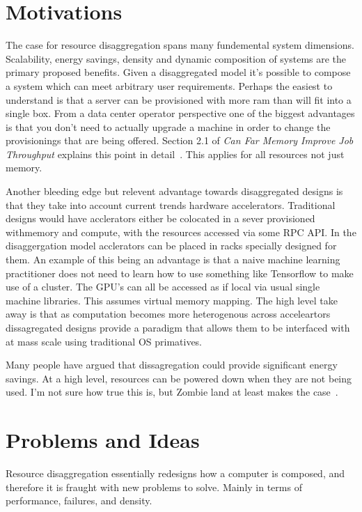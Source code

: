 \section{Motivations}


The case for resource disaggregation spans many fundemental system dimensions.
Scalability, energy savings, density and dynamic composition of systems are the
primary proposed benefits. Given a disaggregated model it’s possible to compose
a system which can meet arbitrary user requirements. Perhaps the easiest to
understand is that a server can be provisioned with more ram than will fit into
a single box.  From a data center operator perspective one of the biggest
advantages is that you don't need to actually upgrade a machine in order to
change the provisionings that are being offered. Section 2.1 of \textit{Can Far
Memory Improve Job Throughput} explains this point in
detail~\cite{jobthroughput}. This applies for all resources not just memory.

Another bleeding edge but relevent advantage towards disaggregated designs is
that they take into account current trends hardware accelerators. Traditional
designs would have acclerators either be colocated in a sever provisioned
withmemory and compute, with the resources accessed via some RPC API. In the
disaggergation model acclerators can be placed in racks specially designed for
them. An example of this being an advantage is that a naive machine learning
practitioner does not need to learn how to use something like Tensorflow to make
use of a cluster. The GPU's can all be accessed as if local via usual single
machine libraries. This assumes virtual memory mapping. The high level take away
is that as computation becomes more heterogenous across acceleartors
dissagregated designs provide a paradigm that allows them to be interfaced with
at mass scale using traditional OS primatives.

Many people have argued that dissagregation could provide significant energy
savings. At a high level, resources can be powered down when they are not being
used. I'm not sure how true this is, but Zombie land at least makes the
case~\cite{zombieland}.

\section{Problems and Ideas}

Resource disaggregation essentially redesigns how a computer is composed, and
therefore it is fraught with new problems to solve. Mainly in terms of
performance, failures, and density.

